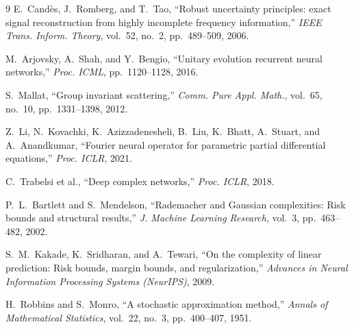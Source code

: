 \documentclass[11pt]{article}
\begin{document}
\begin{thebibliography}{9}
E.~Cand\`es, J.~Romberg, and T.~Tao,
``Robust uncertainty principles: exact signal reconstruction from highly
incomplete frequency information,''
\textit{IEEE Trans. Inform. Theory}, vol.~52, no.~2, pp.~489--509, 2006.

M.~Arjovsky, A.~Shah, and Y.~Bengio,
``Unitary evolution recurrent neural networks,''
\textit{Proc. ICML}, pp.~1120--1128, 2016.

S.~Mallat,
``Group invariant scattering,''
\textit{Comm. Pure Appl. Math.}, vol.~65, no.~10, pp.~1331--1398, 2012.

Z.~Li, N.~Kovachki, K.~Azizzadenesheli, B.~Liu, K.~Bhatt, A.~Stuart, and A.~Anandkumar,
``Fourier neural operator for parametric partial differential equations,''
\textit{Proc. ICLR}, 2021.

C.~Trabelsi et al.,
``Deep complex networks,''
\textit{Proc. ICLR}, 2018.

P.~L.~Bartlett and S.~Mendelson,
``Rademacher and Gaussian complexities: Risk bounds and structural results,''
\textit{J. Machine Learning Research}, vol.~3, pp.~463--482, 2002.

S.~M.~Kakade, K.~Sridharan, and A.~Tewari,
``On the complexity of linear prediction: Risk bounds, margin bounds, and regularization,''
\textit{Advances in Neural Information Processing Systems (NeurIPS)}, 2009.

H.~Robbins and S.~Monro,
``A stochastic approximation method,''
\textit{Annals of Mathematical Statistics}, vol.~22, no.~3, pp.~400--407, 1951.
\end{thebibliography}
\end{document}
